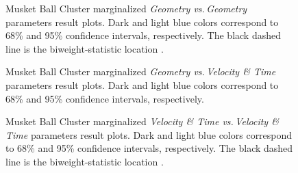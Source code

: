 \documentclass[12pt]{emulateapj}
\begin{document}
\begin{figure}
\caption{Musket Ball Cluster marginalized \emph{Geometry vs.\,Geometry} parameters result plots.  Dark and light blue colors correspond to 68\% and 95\% confidence intervals, respectively.  The black dashed line is the biweight-statistic location \citep{Beers:1982dp}.
\label{musket_geogeo}}
\end{figure}

\begin{figure}
\caption{Musket Ball Cluster marginalized \emph{Geometry vs.\,Velocity \& Time} parameters result plots.  Dark and light blue colors correspond to 68\% and 95\% confidence intervals, respectively.
\label{musket_geovt}}
\end{figure}

\begin{figure}
\caption{Musket Ball Cluster marginalized \emph{Velocity \& Time vs.\,Velocity \& Time} parameters result plots.  Dark and light blue colors correspond to 68\% and 95\% confidence intervals, respectively.  The black dashed line is the biweight-statistic location \citep{Beers:1982dp}.
\label{musket_vtvt}}
\end{figure}
\clearpage								


{}

\end{document}
